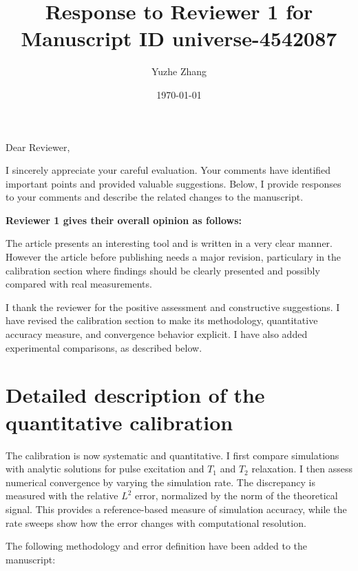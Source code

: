 \documentclass{article}
\newcommand{\refereeOverallComment}[2]{
  \noindent \textbf{Reviewer #1 gives their overall opinion as follows:}
  \begin{mdframed}[linecolor=black]
  #2
  \end{mdframed}
}
\begin{document}
\title{Response to Reviewer 1 for Manuscript ID universe-4542087}

\date{\today}
\author{Yuzhe Zhang}

\maketitle

\noindent Dear Reviewer,
 
I sincerely appreciate your careful evaluation.
Your comments have identified important points and provided valuable suggestions.
Below, I provide responses to your comments and describe the related changes to the manuscript.

\refereeOverallComment{1}{
    The article  presents an interesting tool and is written in a very clear manner. However the article before publishing needs a major revision, particulary in the calibration section where findings should be clearly presented and possibly compared with real measurements.

}

I thank the reviewer for the positive assessment and constructive suggestions. I have revised the calibration section to make its methodology, quantitative accuracy measure, and convergence behavior explicit. I have also added experimental comparisons, as described below.


\section{Detailed description of the quantitative calibration}

The calibration is now systematic and quantitative. I first compare simulations with analytic solutions for pulse excitation and $T_1$ and $T_2$ relaxation. I then assess numerical convergence by varying the simulation rate. The discrepancy is measured with the relative $L^2$ error, normalized by the norm of the theoretical signal. This provides a reference-based measure of simulation accuracy, while the rate sweeps show how the error changes with computational resolution.

The following methodology and error definition have been added to the manuscript:
\end{document}
